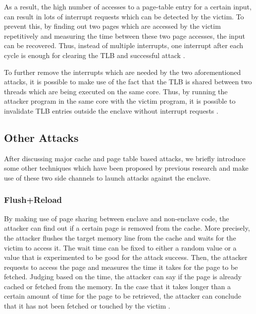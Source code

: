 
As a result, the high number of accesses to a page-table entry for a certain input, can result in lots of interrupt requests which can be detected by the victim. To prevent this, by finding out two pages which are accessed by the victim repetitively and measuring the time between these two page accesses, the input can be recovered. Thus, instead of multiple interrupts, one interrupt after each cycle is enough for clearing the TLB and successful attack \cite{leakycauldron,stealthy}.

To further remove the interrupts which are needed by the two aforementioned attacks, it is possible to make use of the fact that the TLB is shared between two threads which are being executed on the same core. Thus, by running the attacker program in the same core with the victim program, it is possible to invalidate TLB entries outside the enclave without interrupt requests \cite{leakycauldron,stealthy}.

\subsection{Other Attacks}
After discussing major cache and page table based attacks, we briefly introduce some other techniques which have been proposed by previous research and make use of these two side channels to launch attacks against the enclave.

\subsubsection{Flush+Reload}
By making use of page sharing between enclave and non-enclave code, the attacker can find out if a certain page is removed from the cache. More precisely, the attacker flushes the target memory line from the cache and waits for the victim to access it. The wait time can be fixed to either a random value or a value that is experimented to be good for the attack success. Then, the attacker requests to access the page and measures the time it takes for the page to be fetched. Judging based on the time, the attacker can say if the page is already cached or fetched from the memory. In the case that it takes longer than a certain amount of time for the page to be retrieved, the attacker can conclude that it has not been fetched or touched by the victim \cite{flushreload}.

